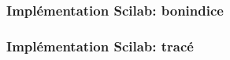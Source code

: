 \begin{frame}
  \frametitle{Implémentation Scilab: bonindice}

\end{frame}

\begin{frame}
  \frametitle{Implémentation Scilab: tracé}

\end{frame}



